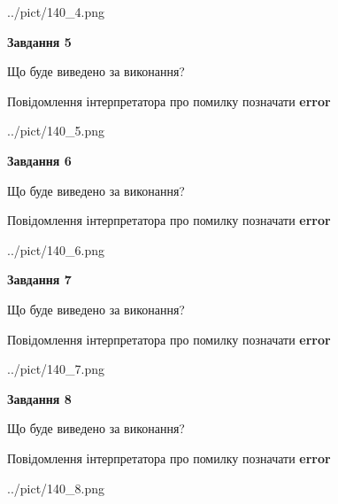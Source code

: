 \documentclass[12pt, ukrainian]{article}
\begin{document}
{\begin{center}
	{../pict/140_4.png}
\end{center}
\newpage

{\begin {center}\textbf{Завдання 5}\end {center}}\par
Що буде виведено за виконання? \par
Повідомлення інтерпретатора про помилку позначати \textbf{error}

\begin{center}
	{../pict/140_5.png}
\end{center}
\newpage

{\begin {center}\textbf{Завдання 6}\end {center}}\par
Що буде виведено за виконання? \par
Повідомлення інтерпретатора про помилку позначати \textbf{error}

\begin{center}
	{../pict/140_6.png}
\end{center}
\newpage

{\begin {center}\textbf{Завдання 7}\end {center}}\par
Що буде виведено за виконання? \par
Повідомлення інтерпретатора про помилку позначати \textbf{error}

\begin{center}
	{../pict/140_7.png}
\end{center}
\newpage

{\begin {center}\textbf{Завдання 8}\end {center}}\par
Що буде виведено за виконання? \par
Повідомлення інтерпретатора про помилку позначати \textbf{error}

\begin{center}
	{../pict/140_8.png}
\end{center}
\newpage

}
\end{document}
